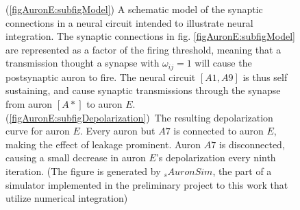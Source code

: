 \begin{figure} %
    \centering
    \caption[An artificial neural circuit to illustrate numerical integration of the $LIF$ neuron. Schematic model and simulation results.]
			{ %
			(\ref{figAuronE:subfigModel}) A schematic model of the synaptic connections in a neural circuit intended to illustrate neural integration.
			The synaptic connections in fig. \ref{figAuronE:subfigModel} are represented as a factor of the firing threshold, meaning that a transmission thought a synapse with $\omega_{ij}=1$ will cause the postsynaptic auron to fire.
			The neural circuit $[A1, A9]$ is thus self sustaining, and cause synaptic transmissions through the synapse from auron $[A*]$ to auron $E$.
			\mbox{(\ref{figAuronE:subfigDepolarization}) The} resulting depolarization curve for auron $E$.
			Every auron but $A7$ is connected to auron $E$, making the effect of leakage prominent.
			Auron $A7$ is disconnected, causing a small decrease in auron $E$'s depolarization every ninth iteration.
			(The figure is generated by \emph{$_s{AuronSim}$}, the part of a simulator implemented in the preliminary project to this work that utilize numerical integration) 
				}
    \label{figExperiment2}
\end{figure}


